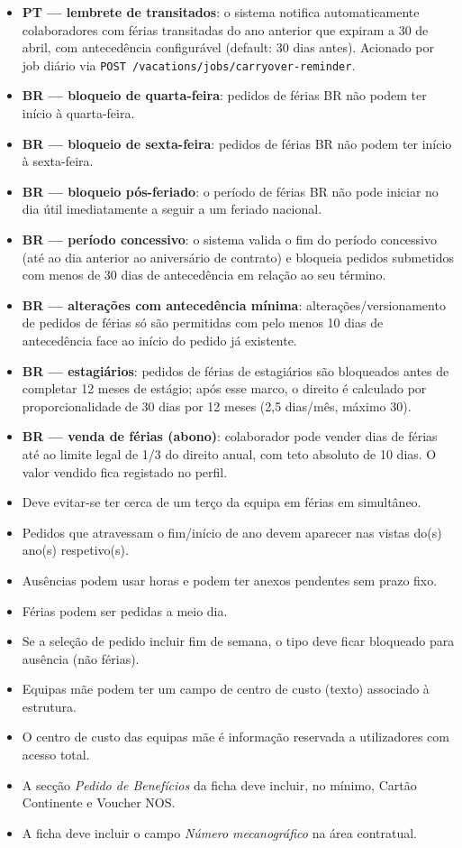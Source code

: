 \documentclass[11pt,a4paper]{article}
\begin{document}
\begin{itemize}
  \item \textbf{PT — lembrete de transitados}: o sistema notifica automaticamente colaboradores com férias transitadas do ano anterior que expiram a 30 de abril, com antecedência configurável (default: 30 dias antes). Acionado por job diário via \texttt{POST /vacations/jobs/carryover-reminder}.
  \item \textbf{BR — bloqueio de quarta-feira}: pedidos de férias BR não podem ter início à quarta-feira.
  \item \textbf{BR — bloqueio de sexta-feira}: pedidos de férias BR não podem ter início à sexta-feira.
  \item \textbf{BR — bloqueio pós-feriado}: o período de férias BR não pode iniciar no dia útil imediatamente a seguir a um feriado nacional.
  \item \textbf{BR — período concessivo}: o sistema valida o fim do período concessivo (até ao dia anterior ao aniversário de contrato) e bloqueia pedidos submetidos com menos de 30 dias de antecedência em relação ao seu término.
  \item \textbf{BR — alterações com antecedência mínima}: alterações/versionamento de pedidos de férias só são permitidas com pelo menos 10 dias de antecedência face ao início do pedido já existente.
  \item \textbf{BR — estagiários}: pedidos de férias de estagiários são bloqueados antes de completar 12 meses de estágio; após esse marco, o direito é calculado por proporcionalidade de 30 dias por 12 meses (2,5 dias/mês, máximo 30).
  \item \textbf{BR — venda de férias (abono)}: colaborador pode vender dias de férias até ao limite legal de 1/3 do direito anual, com teto absoluto de 10 dias. O valor vendido fica registado no perfil.
  \item Deve evitar-se ter cerca de um terço da equipa em férias em simultâneo.
  \item Pedidos que atravessam o fim/início de ano devem aparecer nas vistas do(s) ano(s) respetivo(s).
  \item Ausências podem usar horas e podem ter anexos pendentes sem prazo fixo.
  \item Férias podem ser pedidas a meio dia.
  \item Se a seleção de pedido incluir fim de semana, o tipo deve ficar bloqueado para ausência (não férias).
  \item Equipas mãe podem ter um campo de centro de custo (texto) associado à estrutura.
  \item O centro de custo das equipas mãe é informação reservada a utilizadores com acesso total.
  \item A secção \textit{Pedido de Benefícios} da ficha deve incluir, no mínimo, Cartão Continente e Voucher NOS.
  \item A ficha deve incluir o campo \textit{Número mecanográfico} na área contratual.
\end{itemize}
\end{document}
